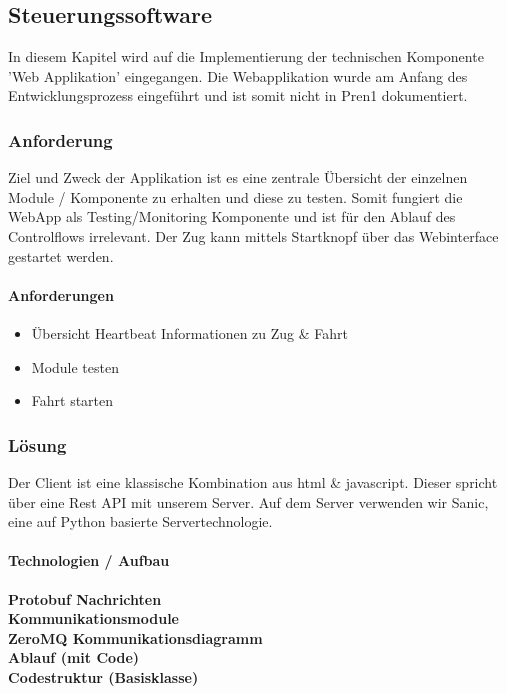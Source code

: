 \documentclass[../../main.tex]{subfiles}
\begin{document}
\subsection{Steuerungssoftware}
In diesem Kapitel wird auf die Implementierung der technischen Komponente 'Web Applikation' eingegangen. Die Webapplikation wurde am Anfang des Entwicklungsprozess eingeführt und ist somit nicht in Pren1 dokumentiert. 
\subsubsection{Anforderung}

Ziel und Zweck der Applikation ist es eine zentrale Übersicht der einzelnen Module / Komponente zu erhalten und diese zu testen. Somit fungiert die WebApp als Testing/Monitoring Komponente und ist für den Ablauf des Controlflows irrelevant. Der Zug kann mittels Startknopf über das Webinterface gestartet werden.

\paragraph{Anforderungen}
\begin{itemize}
    \item Übersicht
      \subitem Heartbeat
      \subitem Informationen zu Zug \& Fahrt
    \item Module testen
    \item Fahrt starten
\end{itemize}

\subsubsection{Lösung}
Der Client ist eine klassische Kombination aus html \& javascript. Dieser spricht über eine Rest API mit unserem Server. Auf dem Server verwenden wir Sanic, eine auf Python basierte Servertechnologie.

\paragraph{Technologien / Aufbau}

\textbf{Protobuf Nachrichten} \\
\textbf{Kommunikationsmodule} \\
\textbf{ZeroMQ Kommunikationsdiagramm} \\
\textbf{Ablauf (mit Code)} \\
\textbf{Codestruktur (Basisklasse)} \\
\end{document}
